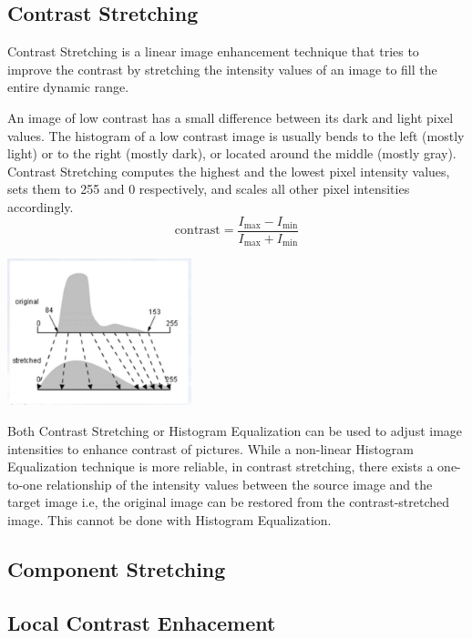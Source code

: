 \documentclass[a4paper,12pt]{article}
\begin{document}
\subsection{Contrast Stretching}
Contrast Stretching is a linear image enhancement technique that tries to
improve the contrast by stretching the intensity values of an image to fill the
entire dynamic range.

An image of low contrast has a small difference between its dark and light
pixel values.  The histogram of a low contrast image is usually bends to the
left (mostly light) or to the right (mostly dark), or located around the middle
(mostly gray).  Contrast Stretching computes the highest and the lowest pixel
intensity values, sets them to 255 and 0 respectively, and scales all other
pixel intensities accordingly.
\[\mathrm{contrast} = \frac{I_\mathrm{max}-I_\mathrm{min}}
                           {I_\mathrm{max}+I_\mathrm{min}}\]

\begin{center}
  \includegraphics[width = 0.40\textwidth]{contrast-mapping.png}
\end{center}

Both Contrast Stretching or Histogram Equalization can be used to adjust image
intensities to enhance contrast of pictures.  While a non-linear Histogram
Equalization technique is more reliable, in contrast stretching, there exists a
one-to-one relationship of the intensity values between the source image and
the target image i.e, the original image can be restored from the
contrast-stretched image.  This cannot be done with Histogram Equalization.

\subsection{Component Stretching}

\subsection{Local Contrast Enhacement}
\end{document}
